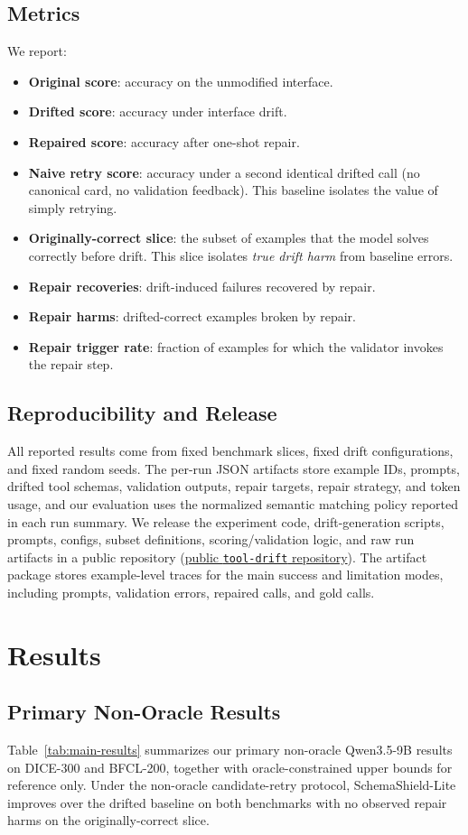 \documentclass[runningheads]{llncs}
\newcommand{\method}{SchemaShield-Lite\xspace}
\newcommand{\artifactrepo}{https://github.com/AniruddhaChattopadhyay/tool-drift}
\newcommand{\artifactrepolink}{\href{\artifactrepo}{public \texttt{tool-drift} repository}}
\begin{document}
\subsection{Metrics}
We report:
\begin{itemize}
\item \textbf{Original score}: accuracy on the unmodified interface.
\item \textbf{Drifted score}: accuracy under interface drift.
\item \textbf{Repaired score}: accuracy after one-shot repair.
\item \textbf{Naive retry score}: accuracy under a second identical drifted call
(no canonical card, no validation feedback). This baseline isolates the value of
simply retrying.
\item \textbf{Originally-correct slice}: the subset of examples that the model solves
correctly before drift. This slice isolates \emph{true drift harm} from baseline
errors.
\item \textbf{Repair recoveries}: drift-induced failures recovered by repair.
\item \textbf{Repair harms}: drifted-correct examples broken by repair.
\item \textbf{Repair trigger rate}: fraction of examples for which the validator
invokes the repair step.
\end{itemize}

\subsection{Reproducibility and Release}
All reported results come from fixed benchmark slices, fixed drift configurations,
and fixed random seeds. The per-run JSON artifacts store example IDs, prompts,
drifted tool schemas, validation outputs, repair targets, repair strategy, and
token usage, and our evaluation uses the normalized semantic matching policy
reported in each run summary. We release the experiment code, drift-generation
scripts, prompts, configs, subset definitions, scoring/validation logic, and
raw run artifacts in a public repository (\artifactrepolink). The artifact package
stores example-level traces for the main success and limitation modes, including
prompts, validation errors, repaired calls, and gold calls.

\section{Results}
\subsection{Primary Non-Oracle Results}
Table~\ref{tab:main-results} summarizes our primary non-oracle Qwen3.5-9B results
on DICE-300 and BFCL-200, together with oracle-constrained upper bounds for
reference only. Under the non-oracle candidate-retry protocol, \method improves
over the drifted baseline on both benchmarks with no observed repair harms on the
originally-correct slice.
\end{document}
